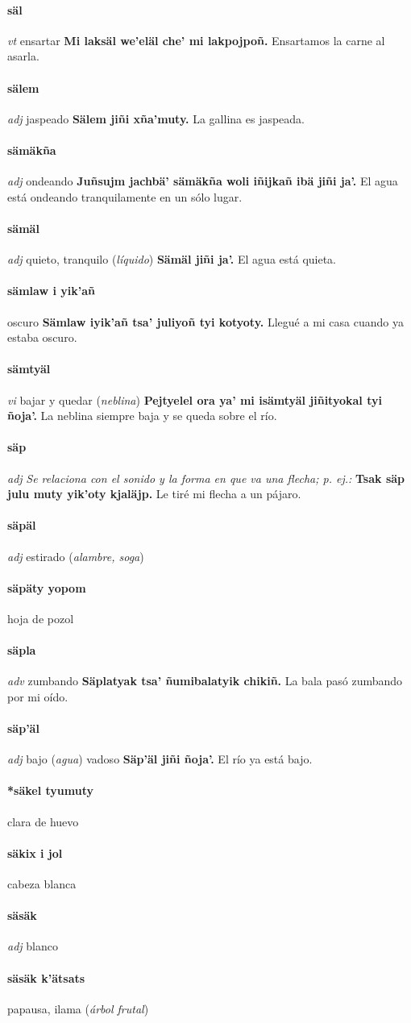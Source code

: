 \documentclass{scrbook}
\newcommand{\entry}[1]{\paragraph{#1}}
\newcommand{\nontranslationdef}[1]{\textit{#1}}
\newcommand{\partofspeech}[1]{\textit{#1}}
\newcommand{\spanishtranslation}[1]{#1}
\newcommand{\clarification}[1]{(\textit{#1})}
\newcommand{\cholexample}[1]{\textbf{#1}}
\newcommand{\exampletranslation}[1]{#1}
\begin{document}
\begin{multicols}{2}
\entry{säl}
\partofspeech{vt}
\spanishtranslation{ensartar}
\cholexample{Mi laksäl we'eläl che' mi lakpojpoñ.}
\exampletranslation{Ensartamos la carne al asarla.}

\entry{sälem}
\partofspeech{adj}
\spanishtranslation{jaspeado}
\cholexample{Sälem jiñi xña'muty.}
\exampletranslation{La gallina es jaspeada.}

\entry{sämäkña}
\partofspeech{adj}
\spanishtranslation{ondeando}
\cholexample{Juñsujm jachbä' sämäkña woli iñijkañ ibä jiñi ja'.}
\exampletranslation{El agua está ondeando tranquilamente en un sólo lugar.}

\entry{sämäl}
\partofspeech{adj}
\spanishtranslation{quieto, tranquilo}
\clarification{líquido}
\cholexample{Sämäl jiñi ja'.}
\exampletranslation{El agua está quieta.}

\entry{sämlaw i yik'añ}
\spanishtranslation{oscuro}
\cholexample{Sämlaw iyik'añ tsa' juliyoñ tyi kotyoty.}
\exampletranslation{Llegué a mi casa cuando ya estaba oscuro.}

\entry{sämtyäl}
\partofspeech{vi}
\spanishtranslation{bajar y quedar}
\clarification{neblina}
\cholexample{Pejtyelel ora ya' mi isämtyäl jiñityokal tyi ñoja'.}
\exampletranslation{La neblina siempre baja y se queda sobre el río.}

\entry{säp}
\partofspeech{adj}
\nontranslationdef{Se relaciona con el sonido y la forma en que va una flecha; p. ej.:}
\cholexample{Tsak säp julu muty yik'oty kjaläjp.}
\exampletranslation{Le tiré mi flecha a un pájaro.}

\entry{säpäl}
\partofspeech{adj}
\spanishtranslation{estirado}
\clarification{alambre, soga}

\entry{säpäty yopom}
\spanishtranslation{hoja de pozol}

\entry{säpla}
\partofspeech{adv}
\spanishtranslation{zumbando}
\cholexample{Säplatyak tsa' ñumibalatyik chikiñ.}
\exampletranslation{La bala pasó zumbando por mi oído.}

\entry{säp'äl}
\partofspeech{adj}
\spanishtranslation{bajo}
\clarification{agua}
\spanishtranslation{vadoso}
\cholexample{Säp'äl jiñi ñoja'.}
\exampletranslation{El río ya está bajo.}

\entry{*säkel tyumuty}
\spanishtranslation{clara de huevo}

\entry{säkix i jol}
\spanishtranslation{cabeza blanca}

\entry{säsäk}
\partofspeech{adj}
\spanishtranslation{blanco}

\entry{säsäk k'ätsats}
\spanishtranslation{papausa, ilama}
\clarification{árbol frutal}


\end{multicols}
\end{document}
